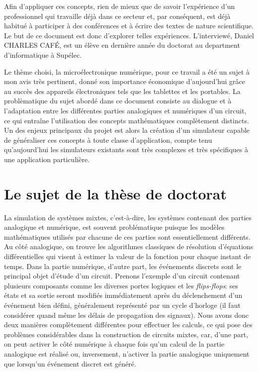 \documentclass{article}
\begin{document}
\vspace{12pt}

Afin d'appliquer ces concepts, rien de mieux que de savoir l'expérience d'un
professionnel qui travaille déjà dans ce secteur et, par conséquent, est déjà
habitué à participer à des conférences et à écrire des textes de nature
scientifique. Le but de ce document est donc d'explorer telles expériences.
L'interviewé, Daniel CHARLES CAFÉ, est un élève en dernière année du doctorat au
department d'informatique à Supélec.


\vspace{12pt}

Le thème choisi, la microélectronique numérique, pour ce travail a été un sujet
à mon avis très pertinent, donné son importance économique d'aujourd'hui grâce
au succès des appareils électroniques tels que les tablettes et les portables. 
La problèmatique du sujet abordé dans ce document consiste au dialogue et
à l'adaptation entre les différentes parties analogiques et numériques d'un
circuit, ce qui entraîne l'utilisation des concepts mathématiques complètement
distincts. Un des enjeux principaux du projet est alors la création d'un
simulateur capable de généraliser ces concepts à toute classe d'application,
compte tenu qu'aujourd'hui les simulateurs existants sont très complexes
et très spécifiques à une application particulière.

\section{Le sujet de la thèse de doctorat}

La simulation de systèmes mixtes, c'est-à-dire, les systèmes contenant des
parties analogique et numérique, est souvent problématique puisque les modèles
mathématiques utilisés par chacune de ces parties sont essentiellement
différents. Au côté analogique, on trouve les algorithmes classiques de
résolution d'équations différentielles qui visent à estimer la valeur de la
fonction pour chaque instant de temps.  Dans la partie numérique, d'autre part,
les événements discrets sont le principal objet d'étude d'un circuit. Prenons
l'exemple d'un circuit contenant plusieurs composants comme les diverses portes
logiques et les \textit{flips-flops}: ses états et sa sortie seront modifiés
immédiatement après du déclenchement d'un événement bien défini, généralement
représenté par un cycle d'horloge (il faut considérer quand même les
délais de propagation des signaux). Nous avons donc deux manières complètement
différentes pour effectuer les calculs, ce qui pose des problèmes considérables 
dans la construction de circuits mixtes, car, d'une part, on peut activer le
côté numérique à chaque fois qu'un calcul de la partie analogique est réalisé
ou, inversement, n'activer la partie analogique uniquement que lorsqu'un
événement discret est généré.
\end{document}
